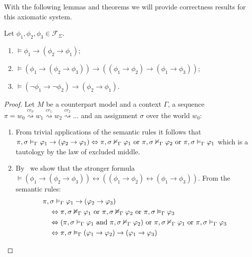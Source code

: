 With the following lemmas and theorems we will provide correctness results for this axiomatic system.

\begin{lemma}\label{lem:propaxioms}
  Let $\phi_1, \phi_2, \phi_3 \in \mathcal{F}_\Sigma$.
  \begin{enumerate}
    \item $\vDash \phi_1 \to (\phi_2 \to \phi_1)$;
    \item $\vDash (\phi_1 \to (\phi_2 \to \phi_3)) \to ((\phi_1 \to \phi_2) \to (\phi_1 \to \phi_3))$;
    \item $\vDash (\neg\phi_1 \to \neg\phi_2) \to (\phi_2 \to \phi_1)$.
  \end{enumerate}
\end{lemma}
\begin{proof}
  Let $M$ be a counterpart model and a context $\Gamma$, a sequence $\pi = w_0 \overset{cr_0}{\rightsquigarrow} w_1 \overset{cr_1}{\rightsquigarrow} w_2 \overset{cr_2}{\rightsquigarrow} \ldots$ and an assignment $\sigma$ over the world $w_0$:
  \begin{enumerate}
    \item From trivial applications of the semantic rules it follows that ${\pi}, {\sigma} \vDash_{\Gamma} {\varphi_1 \to (\varphi_2
      \to \varphi_1)} \Leftrightarrow {\pi}, {\sigma} \nvDash_{\Gamma} {\varphi_1} \text{ or } {\pi}, {\sigma} \nvDash_{\Gamma} {\varphi_2}
      \text{ or } {\pi}, {\sigma} \vDash_{\Gamma} {\varphi_1}$ which is a tautology by the law of excluded middle.

    \item By~ we show that the stronger formula $\vDash (\phi_1 \to (\phi_2 \to \phi_3)) \leftrightarrow ((\phi_1 \to \phi_2)
      \leftrightarrow (\phi_1 \to \phi_3))$. From the semantic rules:
      \[
        \begin{split}
          &{\pi}, {\sigma} \vDash_{\Gamma} {\varphi_1 \to (\varphi_2 \to \varphi_3)} \\
            &\quad\Leftrightarrow {\pi}, {\sigma} \nvDash_{\Gamma} {\varphi_1} \text{ or } {\pi}, {\sigma} \nvDash_{\Gamma} {\varphi_2} \text{ or }
              {\pi}, {\sigma} \vDash_{\Gamma} {\varphi_3} \\
            &\quad\Leftrightarrow ({\pi}, {\sigma} \vDash_{\Gamma} {\varphi_1} \text{ and } {\pi}, {\sigma} \nvDash_{\Gamma} {\varphi_2}) \text{ or }
              {\pi}, {\sigma} \nvDash_{\Gamma} {\varphi_1} \text{ or } {\pi}, {\sigma} \vDash_{\Gamma} {\varphi_3} \\
            &\quad\Leftrightarrow {\pi}, {\sigma} \vDash_{\Gamma} {(\varphi_1 \to \varphi_2) \to (\varphi_1 \to \varphi_3)}
        \end{split}
      \]


\end{enumerate}
\end{proof}
